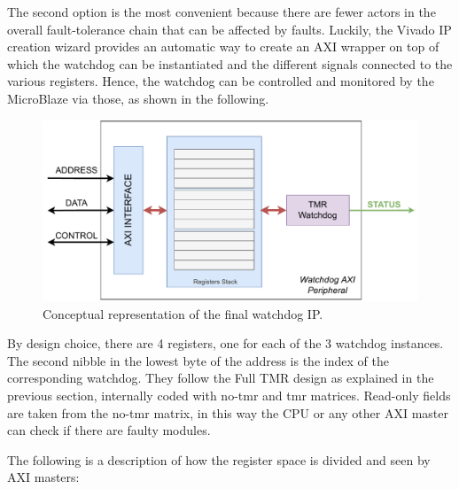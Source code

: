 The second option is the most convenient because there are fewer actors in the overall fault-tolerance chain that can be affected by faults. Luckily, the Vivado IP creation wizard provides an automatic way to create an AXI wrapper on top of which the watchdog can be instantiated and the different signals connected to the various registers. Hence, the watchdog can be controlled and monitored by the MicroBlaze via those, as shown in the following. \bigskip

\begin{figure}[H]
\centering
\includegraphics[width=0.75\linewidth]{images/chapter4/rs2.pdf}
\caption{Conceptual representation of the final watchdog IP.}
\label{fig:rs2}
\end{figure}

By design choice, there are 4 registers, one for each of the 3 watchdog instances. The second nibble in the lowest byte of the address is the index of the corresponding watchdog. They follow the Full TMR design as explained in the previous section, internally coded with no-tmr and tmr matrices. Read-only fields are taken from the no-tmr matrix, in this way the CPU or any other AXI master can check if there are faulty modules. \bigskip

The following is a description of how the register space is divided and seen by AXI masters:

